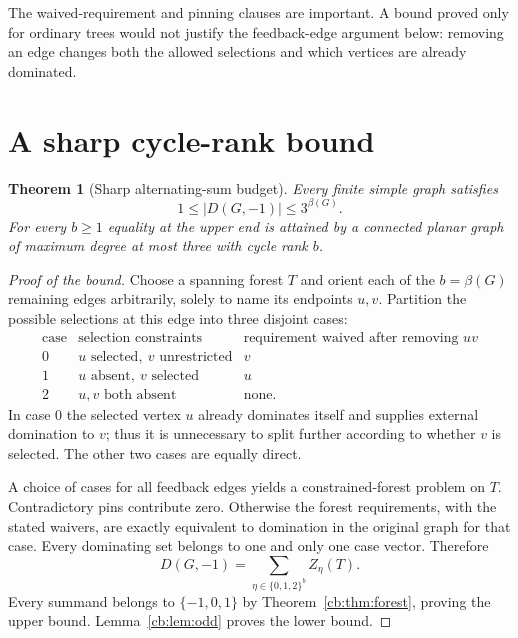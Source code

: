 \documentclass[11pt]{article}
\numberwithin{equation}{section}
\newtheorem{theorem}{Theorem}[section]
\theoremstyle{definition}
\begin{document}
The waived-requirement and pinning clauses are important. A bound proved
only for ordinary trees would not justify the feedback-edge argument below:
removing an edge changes both the allowed selections and which vertices
are already dominated.

\section{A sharp cycle-rank bound}

\begin{theorem}[Sharp alternating-sum budget]\label{cb:thm:budget}
Every finite simple graph satisfies
\begin{equation}\label{cb:eq:mainbound}
 1\le |D(G,-1)|\le3^{\beta(G)}.
\end{equation}
For every $b\ge1$ equality at the upper end is attained by a connected planar
graph of maximum degree at most three with cycle rank $b$.
\end{theorem}
\begin{proof}[Proof of the bound]
Choose a spanning forest $T$ and orient each of the $b=\beta(G)$ remaining
edges arbitrarily, solely to name its endpoints $u,v$. Partition the
possible selections at this edge into three disjoint cases:
\begin{equation}\label{cb:eq:edgecases}
\begin{array}{c|l|l}
\text{case}&\text{selection constraints}&\text{requirement waived after removing }uv\\\hline
0&u\text{ selected},\ v\text{ unrestricted}&v\\
1&u\text{ absent},\ v\text{ selected}&u\\
2&u,v\text{ both absent}&\text{none}.
\end{array}
\end{equation}
In case 0 the selected vertex $u$ already dominates itself and supplies
external domination to $v$; thus it is unnecessary to split further
according to whether $v$ is selected. The other two cases are equally direct.

A choice of cases for all feedback edges yields a constrained-forest
problem on $T$. Contradictory pins contribute zero. Otherwise the forest
requirements, with the stated waivers, are exactly equivalent to domination
in the original graph for that case. Every dominating set belongs to one
and only one case vector. Therefore
\[
 D(G,-1)=\sum_{\eta\in\{0,1,2\}^{b}}Z_\eta(T).
\]
Every summand belongs to $\{-1,0,1\}$ by Theorem~\ref{cb:thm:forest}, proving
the upper bound. Lemma~\ref{cb:lem:odd} proves the lower bound.
\end{proof}
\end{document}
